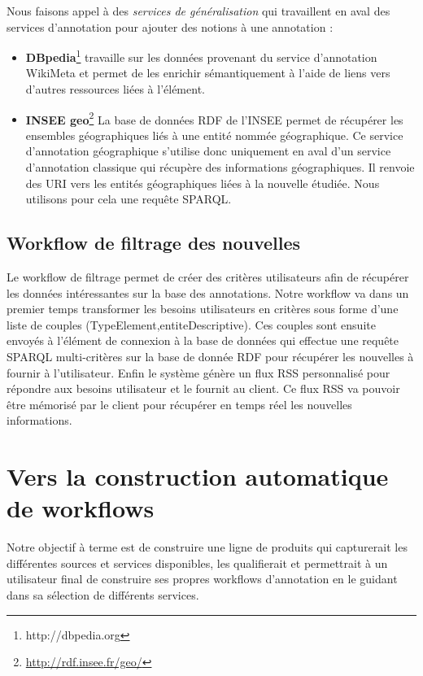 \documentclass[]{easychair}
\begin{document}
Nous faisons appel à des \textit{services de généralisation} qui travaillent en aval des services d'annotation pour ajouter des notions à une annotation :
\begin{itemize}
	\item \textbf{DBpedia}\footnote{http://dbpedia.org} travaille sur les données provenant du service d'annotation WikiMeta et permet de les enrichir sémantiquement à l'aide de liens vers d'autres ressources liées à l'élément.
  \item \textbf{INSEE geo}\footnote{\url{http://rdf.insee.fr/geo/}} La base de données RDF de l'INSEE permet de récupérer les ensembles géographiques liés à une entité nommée géographique. Ce service d'annotation géographique s'utilise donc uniquement en aval d'un service d'annotation classique qui récupère des informations géographiques. Il renvoie des URI vers les entités géographiques liées à la nouvelle étudiée. Nous utilisons pour cela une requête SPARQL.
\end{itemize}

\subsection{Workflow de filtrage des nouvelles}
Le workflow de filtrage permet de créer des critères utilisateurs afin de récupérer les données intéressantes sur la base des annotations. Notre workflow va dans un premier temps transformer les besoins utilisateurs en critères sous forme d'une liste de couples (TypeElement,entiteDescriptive). Ces couples sont ensuite envoyés à l'élément de connexion à la base de données qui effectue une requête SPARQL multi-critères sur la base de donnée RDF pour récupérer les nouvelles à fournir à l'utilisateur. Enfin le système génère un flux RSS personnalisé pour répondre aux besoins utilisateur et le fournit au client. Ce flux RSS va pouvoir être mémorisé par le client pour récupérer en temps réel les nouvelles informations.

\section{Vers la construction automatique de workflows }
\label{sect:perspectives}
Notre objectif à terme est de construire une ligne de produits qui capturerait les différentes sources et services disponibles, les qualifierait et permettrait à un utilisateur final de construire ses propres workflows d'annotation en le guidant dans sa sélection de différents services.
\end{document}
